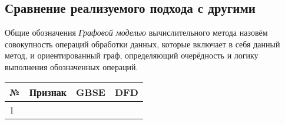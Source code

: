 \subsection{Сравнение реализуемого подхода с другими}
\begin{frame}
    \begin{block}{Общие обозначения}
        \emph{Графовой моделью} вычислительного метода назовём совокупность операций обработки данных, которые включает в себя данный метод, и ориентированный граф, определяющий очерёдность и логику выполнения обозначенных операций.
    \end{block}

\end{frame}

\begin{frame}
    \resizebox{\textwidth}{!}
    {
        \begin{tabular}{|p{0.025\paperwidth}|p{0.275\paperwidth}|p{0.35\paperwidth}|p{0.35\paperwidth}|}
            \hline
            \textbf{№} & \textbf{Признак} & \textbf{GBSE} & \textbf{DFD} \\
            \hline
            1          &                  &               &              \\
            \hline
        \end{tabular}
    }
\end{frame}
